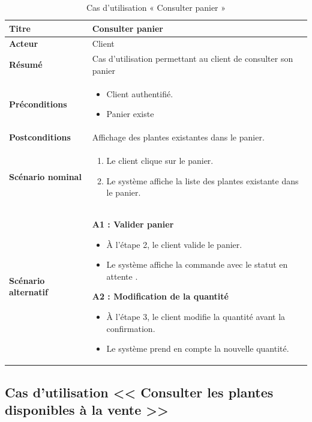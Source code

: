 \begin{table}[H]
\centering
\renewcommand{\arraystretch}{1.4}
\begin{tabular}{|p{4cm}|p{10cm}|}
\hline
\textbf{Titre} & Consulter panier \\
\hline
\textbf{Acteur} & Client \\
\hline
\textbf{Résumé} & Cas d'utilisation permettant au client de consulter son panier \\
\hline
\textbf{Préconditions} &
\vspace{-12pt}
\begin{itemize}
    \item Client authentifié.
    \item Panier existe
\end{itemize} \\
\hline
\textbf{Postconditions} & Affichage des plantes existantes dans le panier. \\
\hline
\textbf{Scénario nominal} &
\vspace{-12pt}
\begin{enumerate}
    \item Le client clique sur le panier.
    \item Le système affiche la liste des plantes existante dans le panier.
\end{enumerate} \\
\hline
\textbf{Scénario alternatif} &
\vspace{-12pt}
\textbf{A1 : Valider panier}
\begin{itemize}
    \item À l'étape 2, le client valide le panier.
    \item Le système affiche la commande avec le statut en attente .
\end{itemize}
\textbf{A2 : Modification de la quantité}
\begin{itemize}
    \item À l'étape 3, le client modifie la quantité avant la confirmation.
    \item Le système prend en compte la nouvelle quantité.
\end{itemize} \\
\hline
\end{tabular}
\caption{Cas d'utilisation « Consulter panier »}
\label{tableau 12}
\end{table}

\subsection{Cas d'utilisation << Consulter les plantes disponibles à la vente >>}


